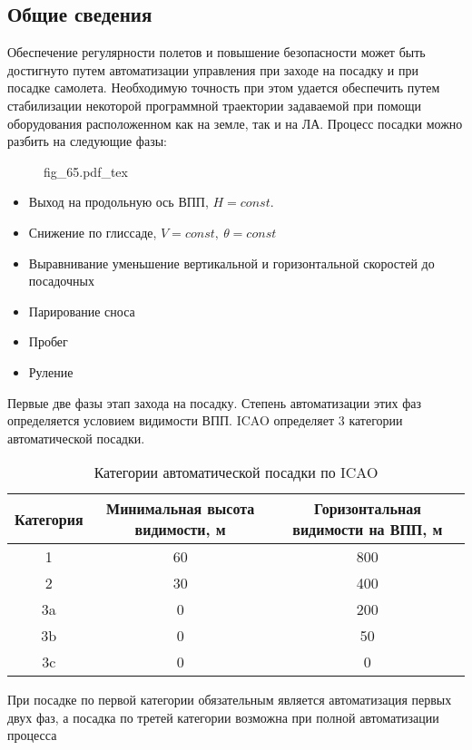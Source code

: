 \documentclass{article}
\newcommand{\incfig}[1]{
    {#1.pdf_tex}
}
\begin{document}
\subsection{Общие сведения}
Обеспечение регулярности полетов и повышение безопасности может быть достигнуто
путем автоматизации управления при заходе на посадку и при посадке самолета.
Необходимую точность при этом удается обеспечить путем стабилизации некоторой
программной траектории задаваемой при помощи оборудования расположенном как на
земле, так и на ЛА.
Процесс посадки можно разбить на следующие фазы:
\begin{figure}[H]
	\centering
	\incfig{fig_65}
	\label{fig:fig_65}
\end{figure}
\begin{itemize}
	\item  Выход на продольную ось ВПП, $H=const$.
	\item Снижение по глиссаде, $V=const, \ \theta = const$
	\item Выравнивание уменьшение вертикальной и горизонтальной скоростей до
	      посадочных
	\item Парирование сноса
	\item Пробег
	\item Руление
\end{itemize}
Первые две фазы этап захода на посадку. Степень автоматизации этих фаз
определяется условием видимости ВПП. ICAO определяет 3 категории
автоматической посадки.
\begin{table}[H]
	\centering
	\caption{Категории автоматической посадки по ICAO}
	\label{tab:label}
	\begin{tabular}{|c|c|c|}
		\toprule
		Категория & Минимальная высота видимости, м & Горизонтальная видимости
		на ВПП, м                                                              \\
		\midrule
		1         & 60                              & 800
		\\
		2         & 30                              & 400
		\\
		3a        & 0                               & 200
		\\
		3b        & 0                               & 50
		\\
		3c        & 0                               & 0
		\\
		\bottomrule
	\end{tabular}
\end{table}
При посадке по первой категории обязательным является автоматизация первых двух
фаз, а посадка по третей категории возможна при полной автоматизации процесса
\end{document}
